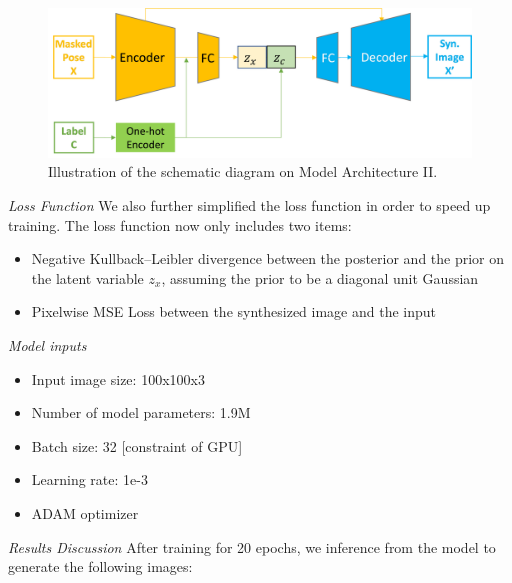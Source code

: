 \documentclass{article}
\begin{document}
\begin{figure}[H]
    \centering
    \includegraphics[scale=0.11]{fig4.png}
    \caption{Illustration of the schematic diagram on Model Architecture II.}
\end{figure}

\noindent
\textit{Loss Function}
\newline
\newline
We also further simplified the loss function in order to speed up training. The loss function now only includes two items:

\begin{itemize}
\item Negative Kullback–Leibler divergence between the posterior and the prior on the latent variable $z_x$, assuming the prior to be a diagonal unit Gaussian
\item Pixelwise MSE Loss between the synthesized image and the input
\end{itemize}

\noindent
\textit{Model inputs}
\begin{itemize}
\item Input image size: 100x100x3
\item Number of model parameters: 1.9M
\item Batch size: 32 [constraint of GPU]
\item Learning rate: 1e-3
\item ADAM optimizer
\end{itemize}

\noindent
\textit{Results Discussion}
\newline
\newline
After training for 20 epochs, we inference from the model to generate the following images:
\end{document}
